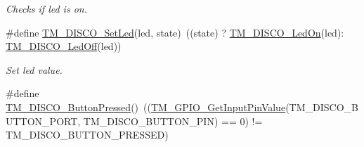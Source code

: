 \begin{DoxyCompactItemize}
\begin{DoxyCompactList}\small\item\em Checks if led is on. \end{DoxyCompactList}\item 
\#define \hyperlink{group___t_m___d_i_s_c_o___functions_ga45b9e10ff16b153c3d26db3a23481623}{T\+M\+\_\+\+D\+I\+S\+C\+O\+\_\+\+Set\+Led}(led,  state)~((state) ? \hyperlink{group___t_m___d_i_s_c_o___functions_ga72aa66c1c0647cf3bbb3c2c069f1901a}{T\+M\+\_\+\+D\+I\+S\+C\+O\+\_\+\+Led\+On}(led)\+: \hyperlink{group___t_m___d_i_s_c_o___functions_gab295e2ecb3dc81210a9af3f5281cae79}{T\+M\+\_\+\+D\+I\+S\+C\+O\+\_\+\+Led\+Off}(led))
\begin{DoxyCompactList}\small\item\em Set led value. \end{DoxyCompactList}\item 
\#define \hyperlink{group___t_m___d_i_s_c_o___functions_ga02c997906998f75a6cd676810022f9b3}{T\+M\+\_\+\+D\+I\+S\+C\+O\+\_\+\+Button\+Pressed}()~((\hyperlink{group___t_m___g_p_i_o___functions_gacd91a02149d1f1bc648a3fe06648460d}{T\+M\+\_\+\+G\+P\+I\+O\+\_\+\+Get\+Input\+Pin\+Value}(T\+M\+\_\+\+D\+I\+S\+C\+O\+\_\+\+B\+U\+T\+T\+O\+N\+\_\+\+P\+O\+R\+T, T\+M\+\_\+\+D\+I\+S\+C\+O\+\_\+\+B\+U\+T\+T\+O\+N\+\_\+\+P\+I\+N) == 0) != T\+M\+\_\+\+D\+I\+S\+C\+O\+\_\+\+B\+U\+T\+T\+O\+N\+\_\+\+P\+R\+E\+S\+S\+E\+D)
\end{DoxyCompactItemize}
